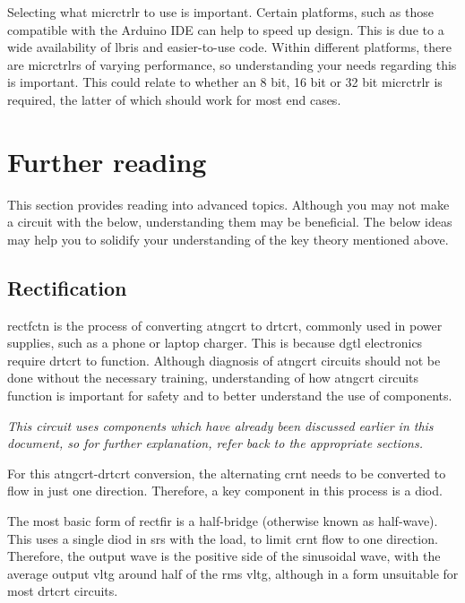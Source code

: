 \documentclass[a4paper,11pt]{report}
\newcommand{\Theory}[1] %
{
\phantomsection %
\todo[inline, color=green!30]{\textbf{#1}} %
\vspace{1em} %
}
\begin{document}
Selecting what \gls{micrctrlr} to use is important. Certain platforms, such as those compatible with the Arduino IDE can help to speed up design. This is due to a wide availability of \gls{lbris} and easier-to-use code. Within different platforms, there are \gls{micrctrlr}s of varying performance, so understanding your needs regarding this is important. This could relate to whether an 8 bit, 16 bit or 32 bit \gls{micrctrlr} is required, the latter of which should work for most end cases.

\pagebreak

\section{Further reading}

This section provides reading into advanced topics. Although you may not make a circuit with the below, understanding them may be beneficial. The below ideas may help you to solidify your understanding of the key theory mentioned above.

\vspace*{1\baselineskip}

\subsection{Rectification}

\Theory{What is \gls{rectfctn}?}

\gls{rectfctn} is the process of converting \gls{atngcrt} to \gls{drtcrt}, commonly used in power supplies, such as a phone or laptop charger. This is because \gls{dgtl} electronics require \gls{drtcrt} to function. Although diagnosis of \gls{atngcrt} circuits should not be done without the necessary training, understanding of how \gls{atngcrt} circuits function is important for safety and to better understand the use of components.

\textit{This circuit uses components which have already been discussed earlier in this document, so for further explanation, refer back to the appropriate sections.}

For this \gls{atngcrt}-\gls{drtcrt} conversion, the alternating \gls{crnt} needs to be converted to flow in just one direction. Therefore, a key component in this process is a \gls{diod}.

The most basic form of \gls{rectfir} is a half-bridge (otherwise known as half-wave). This uses a single \gls{diod} in \gls{srs} with the load, to limit \gls{crnt} flow to one direction. Therefore, the output wave is the positive side of the sinusoidal wave, with the average output \gls{vltg} around half of the \gls{rms} \gls{vltg}, although in a form unsuitable for most \gls{drtcrt} circuits.
\end{document}
